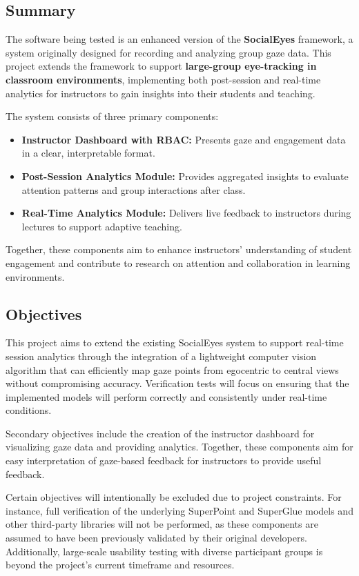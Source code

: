 \documentclass[12pt, titlepage]{article}
\begin{document}
\subsection{Summary}

The software being tested is an enhanced version of the \textbf{SocialEyes} framework, a system originally designed for recording and analyzing group gaze data. This project extends the framework to support \textbf{large-group eye-tracking in classroom environments}, implementing both post-session and real-time analytics for instructors to gain insights into their students and teaching.\newline

The system consists of three primary components:

\begin{itemize}
    \item \textbf{Instructor Dashboard with RBAC:} Presents gaze and engagement data in a clear, interpretable format.
    \item \textbf{Post-Session Analytics Module:} Provides aggregated insights to evaluate attention patterns and group interactions after class.
    \item \textbf{Real-Time Analytics Module:} Delivers live feedback to instructors during lectures to support adaptive teaching.
\end{itemize}

Together, these components aim to enhance instructors’ understanding of student engagement and contribute to research on attention and collaboration in learning environments.

\subsection{Objectives}
This project aims to extend the existing SocialEyes system to support real-time session analytics through the integration of a lightweight computer vision algorithm that can efficiently map gaze points from egocentric to central views without compromising accuracy. Verification tests will focus on ensuring that the implemented models will perform correctly and consistently under real-time conditions.

Secondary objectives include the creation of the instructor dashboard for visualizing gaze data and providing analytics. Together, these components aim for easy interpretation of gaze-based feedback for instructors to provide useful feedback.

Certain objectives will intentionally be excluded due to project constraints. For instance, full verification of the underlying SuperPoint and SuperGlue models and other third-party libraries will not be performed, as these components are assumed to have been previously validated by their original developers. Additionally, large-scale usability testing with diverse participant groups is beyond the project’s current timeframe and resources. 
\end{document}
